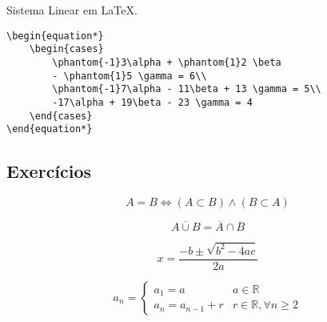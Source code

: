 \begin{programcode}{Sistema Linear em \LaTeX.}
\begin{verbatim}
\begin{equation*}
    \begin{cases}
        \phantom{-1}3\alpha + \phantom{1}2 \beta 
        - \phantom{1}5 \gamma = 6\\
        \phantom{-1}7\alpha - 11\beta + 13 \gamma = 5\\
        -17\alpha + 19\beta - 23 \gamma = 4
    \end{cases}
\end{equation*}
\end{verbatim}
\end{programcode}

\newpage

\subsection{Exerc\'{i}cios}

\begin{prob}
\label{prob1}
\begin{equation*}
    A = B \Leftrightarrow (A \subset B) \wedge (B \subset A)
\end{equation*}
\end{prob}

\begin{prob}
\label{prob2}
\begin{equation*}
    \overline{A \cup B} = \overline{A} \cap \overline{B}
\end{equation*}
\end{prob}

\begin{prob}
\label{prob3}
\begin{equation*}
    \boxed{x = \frac{-b\pm\sqrt{b^{2}-4ac}}{2a}}
\end{equation*}
\end{prob}

\begin{prob}
\label{prob4}
\begin{equation*}
    a_n = \begin{cases}
                a_1 = a & a\in\mathbb{R}\\
                a_n = a_{n-1} + r & r\in\mathbb{R},\forall n \ge 2
               \end{cases}
\end{equation*}
\end{prob}

